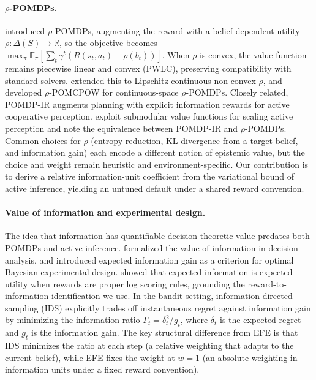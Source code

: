 \documentclass[runningheads]{llncs}
\begin{document}
\paragraph{$\rho$-POMDPs.}
\citet{araya2010} introduced $\rho$-POMDPs, augmenting the reward with a belief-dependent utility $\rho : \Delta(S) \to \mathbb{R}$, so the objective becomes $\max_\pi \mathbb{E}_\pi[\sum_t \gamma^t (R(s_t,a_t) + \rho(b_t))]$. When $\rho$ is convex, the value function remains piecewise linear and convex (PWLC), preserving compatibility with standard solvers. \citet{fehr2018} extended this to Lipschitz-continuous non-convex $\rho$, and \citet{benchetrit2025} developed $\rho$-POMCPOW for continuous-space $\rho$-POMDPs. Closely related, POMDP-IR \citep{spaan2015} augments planning with explicit information rewards for active cooperative perception. \citet{satsangi2018} exploit submodular value functions for scaling active perception and note the equivalence between POMDP-IR and $\rho$-POMDPs. Common choices for $\rho$ (entropy reduction, KL divergence from a target belief, and information gain) each encode a different notion of epistemic value, but the choice and weight remain heuristic and environment-specific. Our contribution is to derive a relative information-unit coefficient from the variational bound of active inference, yielding an untuned default under a shared reward convention.

\paragraph{Value of information and experimental design.}
The idea that information has quantifiable decision-theoretic value predates both POMDPs and active inference. \citet{howard1966} formalized the value of information in decision analysis, and \citet{lindley1956} introduced expected information gain as a criterion for optimal Bayesian experimental design. \citet{bernardo1979} showed that expected information is expected utility when rewards are proper log scoring rules, grounding the reward-to-information identification we use. In the bandit setting, information-directed sampling (IDS) \citep{russo2014} explicitly trades off instantaneous regret against information gain by minimizing the information ratio $\Gamma_t = \delta_t^2 / g_t$, where $\delta_t$ is the expected regret and $g_t$ is the information gain. The key structural difference from EFE is that IDS minimizes the ratio at each step (a relative weighting that adapts to the current belief), while EFE fixes the weight at $w{=}1$ (an absolute weighting in information units under a fixed reward convention).
\end{document}
